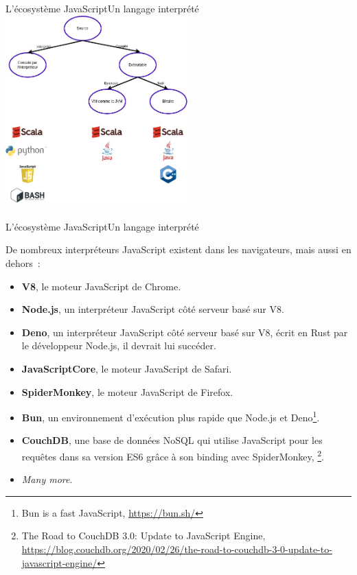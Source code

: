 \documentclass{beamer}
\begin{document}
\begin{frame}{L'écosystème JavaScript}{Un langage interprété}
    \centering
    \includegraphics[width=7cm]{image/code-inter-vs-compiled}
\end{frame}

\begin{frame}{L'écosystème JavaScript}{Un langage interprété}
    \begin{small}
        De nombreux interpréteurs JavaScript existent dans les navigateurs, mais aussi en dehors~:
        \begin{itemize}
            \item \textbf{V8}, le moteur JavaScript de Chrome.
            \item \textbf{Node.js}, un interpréteur JavaScript côté serveur basé sur V8.
            \item \textbf{Deno}, un interpréteur JavaScript côté serveur basé sur V8, écrit en Rust par le développeur Node.js, il devrait lui succéder.
            \item \textbf{JavaScriptCore}, le moteur JavaScript de Safari.
            \item \textbf{SpiderMonkey}, le moteur JavaScript de Firefox.
            \item \textbf{Bun}, un environnement d'exécution plus rapide que Node.js et Deno\footnote{\label{bun}Bun is a fast JavaScript, \url{https://bun.sh/}}.
            \item \textbf{CouchDB}, une base de données NoSQL qui utilise JavaScript pour les requêtes dans sa version ES6 grâce à son binding avec SpiderMonkey, \footnote{The Road to CouchDB 3.0: Update to JavaScript Engine, \url{https://blog.couchdb.org/2020/02/26/the-road-to-couchdb-3-0-update-to-javascript-engine/}}.
            \item \textit{Many more}.
        \end{itemize}
    \end{small}
\end{frame}
\end{document}
